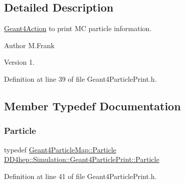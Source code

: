 \subsection{Detailed Description}
\hyperlink{class_d_d4hep_1_1_simulation_1_1_geant4_action}{Geant4\+Action} to print MC particle information. 

\begin{DoxyAuthor}{Author}
M.\+Frank 
\end{DoxyAuthor}
\begin{DoxyVersion}{Version}
1. 
\end{DoxyVersion}


Definition at line 39 of file Geant4\+Particle\+Print.\+h.



\subsection{Member Typedef Documentation}
\hypertarget{class_d_d4hep_1_1_simulation_1_1_geant4_particle_print_a0d1712b05821d64c3f75e6226f553aa2}{}\label{class_d_d4hep_1_1_simulation_1_1_geant4_particle_print_a0d1712b05821d64c3f75e6226f553aa2} 
\subsubsection{\texorpdfstring{Particle}{Particle}}
{\footnotesize\ttfamily typedef \hyperlink{class_d_d4hep_1_1_simulation_1_1_geant4_particle_map_a01ed68f2fc2e55ecf936e5ac3e6eae5f}{Geant4\+Particle\+Map\+::\+Particle} \hyperlink{class_d_d4hep_1_1_simulation_1_1_geant4_particle_print_a0d1712b05821d64c3f75e6226f553aa2}{D\+D4hep\+::\+Simulation\+::\+Geant4\+Particle\+Print\+::\+Particle}}



Definition at line 41 of file Geant4\+Particle\+Print.\+h.

\hypertarget{class_d_d4hep_1_1_simulation_1_1_geant4_particle_print_a1c6a9ccb9393484ee16c7cd344e20f4a}{}\label{class_d_d4hep_1_1_simulation_1_1_geant4_particle_print_a1c6a9ccb9393484ee16c7cd344e20f4a} 
